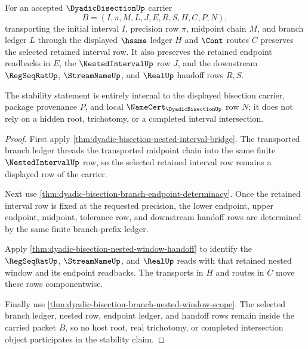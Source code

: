 \begin{theorem}
\label{thm:dyadic-bisection-selector-interval-stability}
For an accepted $\DyadicBisectionUp$ carrier
$$
B=(I,\pi,M,L,J,E,R,S,H,C,P,N),
$$
transporting the initial interval $I$, precision row $\pi$, midpoint chain $M$, and branch ledger $L$ through the displayed $\hsame$ ledger $H$ and $\Cont$ routes $C$ preserves the selected retained interval row. It also preserves the retained endpoint readbacks in $E$, the $\NestedIntervalUp$ row $J$, and the downstream $\RegSeqRatUp$, $\StreamNameUp$, and $\RealUp$ handoff rows $R,S$.

The stability statement is entirely internal to the displayed bisection carrier, package provenance $P$, and local $\NameCert_{\DyadicBisectionUp}$ row $N$; it does not rely on a hidden root, trichotomy, or a completed interval intersection.
\end{theorem}
\begin{proof}
First apply \autoref{thm:dyadic-bisection-nested-interval-bridge}. The transported branch ledger threads the transported midpoint chain into the same finite $\NestedIntervalUp$ row, so the selected retained interval row remains a displayed row of the carrier.

Next use \autoref{thm:dyadic-bisection-branch-endpoint-determinacy}. Once the retained interval row is fixed at the requested precision, the lower endpoint, upper endpoint, midpoint, tolerance row, and downstream handoff rows are determined by the same finite branch-prefix ledger.

Apply \autoref{thm:dyadic-bisection-nested-window-handoff} to identify the $\RegSeqRatUp$, $\StreamNameUp$, and $\RealUp$ reads with that retained nested window and its endpoint readbacks. The transports in $H$ and routes in $C$ move these rows componentwise.

Finally use \autoref{thm:dyadic-bisection-branch-nested-window-scope}. The selected branch ledger, nested row, endpoint ledger, and handoff rows remain inside the carried packet $B$, so no host root, real trichotomy, or completed intersection object participates in the stability claim.
\end{proof}

